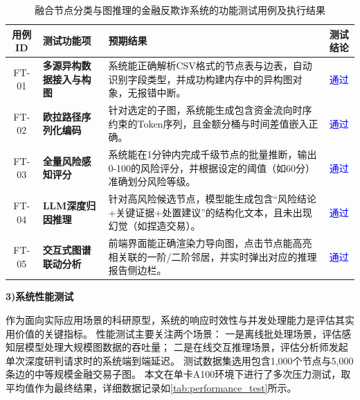 \begin{table}[htbp]
    \centering
    \caption{融合节点分类与图推理的金融反欺诈系统的功能测试用例及执行结果}
    \label{tab:functional_test}
    \small
    \renewcommand{\arraystretch}{1.3}
    \begin{tabular}{c p{} p{} c}
        \toprule
        \textbf{用例ID} & \textbf{测试功能项} & \textbf{预期结果} & \textbf{测试结论} \\
        \midrule
        FT-01 & 
        \textbf{多源异构数据接入与构图} & 
        系统能正确解析CSV格式的节点表与边表，自动识别字段类型，并成功构建内存中的异构图对象，无报错中断。 & 
        \textcolor{blue}{通过} \\
        \hline
        
        FT-02 & 
        \textbf{欧拉路径序列化编码} & 
        针对选定的子图，系统能生成包含资金流向时序约束的Token序列，且金额分桶与时间差值嵌入正确。 & 
        \textcolor{blue}{通过} \\
        \hline
        
        FT-03 & 
        \textbf{全量风险感知评分} & 
        系统能在1分钟内完成千级节点的批量推断，输出0-100的风险评分，并根据设定的阈值（如60分）准确划分风险等级。 & 
        \textcolor{blue}{通过} \\
        \hline
        
        FT-04 & 
        \textbf{LLM深度归因推理} & 
        针对高风险候选节点，模型能生成包含“风险结论+关键证据+处置建议”的结构化文本，且未出现幻觉（如捏造交易）。 & 
        \textcolor{blue}{通过} \\
        \hline
        
        FT-05 & 
        \textbf{交互式图谱联动分析} & 
        前端界面能正确渲染力导向图，点击节点能高亮相关联的一阶/二阶邻居，并实时弹出对应的推理报告侧边栏。 & 
        \textcolor{blue}{通过} \\
        \bottomrule
    \end{tabular}
\end{table}


\textbf{3)系统性能测试}

作为面向实际应用场景的科研原型，系统的响应时效性与并发处理能力是评估其实用价值的关键指标。
性能测试主要关注两个场景：
一是离线批处理场景，评估感知层模型处理大规模图数据的吞吐量；
二是在线交互推理场景，评估分析师发起单次深度研判请求时的系统端到端延迟。
测试数据集选用包含1,000个节点与5,000条边的中等规模金融交易子图。
本文在单卡A100环境下进行了多次压力测试，取平均值作为最终结果，详细数据记录如\autoref{tab:performance_test}所示。



